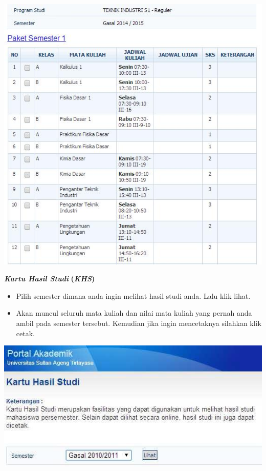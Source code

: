 \documentclass[
]{book}
\begin{document}
\begin{enumerate}
  \includegraphics{static/3.7.jpg}

  \textbf{\emph{Kartu Hasil Studi}} \textbf{(\emph{KHS})}

  \begin{itemize}
  \item
    Pilih semester dimana anda ingin melihat hasil studi anda. Lalu klik lihat.
  \item
    Akan muncul seluruh mata kuliah dan nilai mata kuliah yang pernah anda ambil pada semester tersebut. Kemudian jika ingin mencetaknya silahkan klik cetak.
  \end{itemize}

  \includegraphics{static/3.8.jpg}


\end{enumerate}
\end{document}
